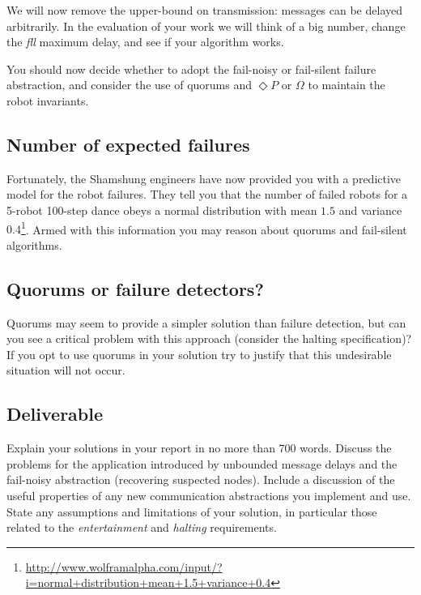 \documentclass[a4paper]{article}
\begin{document}
We will now remove the upper-bound on transmission: messages can be delayed
arbitrarily. In the evaluation of your work we will think of a big number,
change the \emph{fll} maximum delay, and see if your algorithm works.

You should now decide whether to adopt the fail-noisy or fail-silent failure
abstraction, and consider the use of quorums and $\Diamond P$ or $\Omega$ to
maintain the robot invariants.

\subsection*{Number of expected failures} %
\label{sub:number_of_expected_failures}

Fortunately, the Shamshung engineers have now provided you with a predictive
model for the robot failures. They tell you that the number of failed robots
for a 5-robot 100-step dance obeys a normal distribution with mean $1.5$ and
variance
$0.4$\footnote{\url{http://www.wolframalpha.com/input/?i=normal+distribution+mean+1.5+variance+0.4}}.
Armed with this information you may reason about quorums and fail-silent
algorithms.



\subsection*{Quorums or failure detectors?} %
\label{sub:difficulty_of_quorums_vs_diamond_p_}

Quorums may seem to provide a simpler solution than failure detection, but can
you see a critical problem with this approach (consider the halting
specification)? If you opt to use quorums in your solution try to justify that
this undesirable situation will not occur.



\subsection*{Deliverable} %
\label{sub:p3_deliverable}

Explain your solutions in your report in no more than 700 words.
Discuss the problems for the application introduced by unbounded message
delays and the fail-noisy abstraction (recovering suspected nodes).
Include a discussion of the useful properties of any new
communication abstractions you implement and use.
State any assumptions and limitations of your solution, in particular those
related to the \emph{entertainment} and \emph{halting} requirements.
\end{document}
